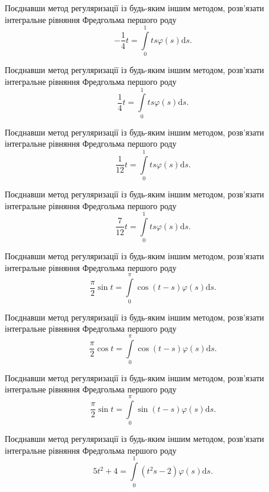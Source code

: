 \documentclass[12pt]{extarticle}
\begin{document}
\begin{Exercise}
Поєднавши метод регуляризації із будь-яким іншим методом, розв’язати інтегральне рівняння Фредгольма першого роду \[-\dfrac{1}{4}t = \int\limits_{0}^{1} ts \varphi(s) \mathrm{d}s.\]
\end{Exercise}

\begin{Exercise}
Поєднавши метод регуляризації із будь-яким іншим методом, розв’язати інтегральне рівняння Фредгольма першого роду \[\dfrac{1}{4}t = \int\limits_{0}^{1} ts \varphi(s) \mathrm{d}s.\]
\end{Exercise}

\begin{Exercise}
Поєднавши метод регуляризації із будь-яким іншим методом, розв’язати інтегральне рівняння Фредгольма першого роду \[\dfrac{1}{12}t = \int\limits_{0}^{1} ts \varphi(s) \mathrm{d}s.\]
\end{Exercise}

\begin{Exercise}
Поєднавши метод регуляризації із будь-яким іншим методом, розв’язати інтегральне рівняння Фредгольма першого роду \[\dfrac{7}{12}t = \int\limits_{0}^{1} ts \varphi(s) \mathrm{d}s.\]
\end{Exercise}

\begin{Exercise}
Поєднавши метод регуляризації із будь-яким іншим методом, розв’язати інтегральне рівняння Фредгольма першого роду \[\dfrac{\pi}{2}\sin t = \int\limits_{0}^{\pi} \cos (t-s) \varphi(s) \mathrm{d}s.\]
\end{Exercise}

\begin{Exercise}
Поєднавши метод регуляризації із будь-яким іншим методом, розв’язати інтегральне рівняння Фредгольма першого роду \[\dfrac{\pi}{2}\cos t = \int\limits_{0}^{\pi} \cos (t-s) \varphi(s) \mathrm{d}s.\]
\end{Exercise}

\begin{Exercise}
Поєднавши метод регуляризації із будь-яким іншим методом, розв’язати інтегральне рівняння Фредгольма першого роду \[\dfrac{\pi}{2}\sin t = \int\limits_{0}^{\pi} \sin (t - s) \varphi(s) \mathrm{d}s.\]
\end{Exercise}

\begin{Exercise}
Поєднавши метод регуляризації із будь-яким іншим методом, розв’язати інтегральне рівняння Фредгольма першого роду \[5t^2 + 4 = \int\limits_{0}^{1} \left(t^2 s - 2 \right) \varphi(s) \mathrm{d}s.\]
\end{Exercise}
\end{document}
